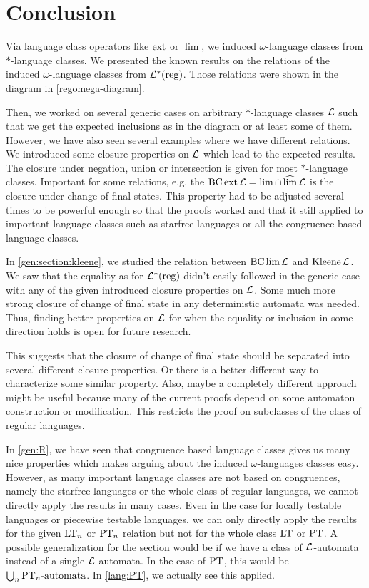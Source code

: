 \section{Conclusion}
\label{chapter:conclusion}

Via language class operators like $\operatorname{ext}$ or $\lim$, we induced $\omega$-language classes from $*$-language classes. We presented the known results on the relations of the induced $\omega$-language classes from $\mathcal{L}^*(\textup{\textrm{reg}})$. Those relations were shown in the diagram in \cref{regomega-diagram}.

Then, we worked on several generic cases on arbitrary $*$-language classes $\mathcal{L}$ such that we get the expected inclusions as in the diagram or at least some of them. However, we have also seen several examples where we have different relations. We introduced some closure properties on $\mathcal{L}$ which lead to the expected results. The closure under negation, union or intersection is given for most $*$-language classes. Important for some relations, e.g. the $\operatorname{BC} \operatorname{ext} \mathcal{L} = \lim \cap \operatorname{\widehat{lim}} \mathcal{L}$ is the closure under change of final states. This property had to be adjusted several times to be powerful enough so that the proofs worked and that it still applied to important language classes such as starfree languages or all the congruence based language classes.

In \cref{gen:section:kleene}, we studied the relation between $\operatorname{BC} \lim \mathcal{L}$ and $\operatorname{Kleene} \mathcal{L}$. We saw that the equality as for $\mathcal{L}^*(\textup{\textrm{reg}})$ didn't easily followed in the generic case with any of the given introduced closure properties on $\mathcal{L}$. Some much more strong closure of change of final state in any deterministic automata was needed. Thus, finding better properties on $\mathcal{L}$ for when the equality or inclusion in some direction holds is open for future research.

This suggests that the closure of change of final state should be separated into several different closure properties. Or there is a better different way to characterize some similar property. Also, maybe a completely different approach might be useful because many of the current proofs depend on some automaton construction or modification. This restricts the proof on subclasses of the class of regular languages.

In \cref{gen:R}, we have seen that congruence based language classes gives us many nice properties which makes arguing about the induced $\omega$-languages classes easy. However, as many important language classes are not based on congruences, namely the starfree languages or the whole class of regular languages, we cannot directly apply the results in many cases. Even in the case for locally testable languages or piecewise testable languages, we can only directly apply the results for the given $\textup{\textrm{LT}}_n$ or $\textup{\textrm{PT}}_n$ relation but not for the whole class $\textup{\textrm{LT}}$ or $\textup{\textrm{PT}}$. A possible generalization for the section would be if we have a class of $\mathcal{L}$-automata instead of a single $\mathcal{L}$-automata. In the case of $\textup{\textrm{PT}}$, this would be $\bigcup_n \text{$\textup{\textrm{PT}}_n$-automata}$. In \cref{lang:PT}, we actually see this applied.

